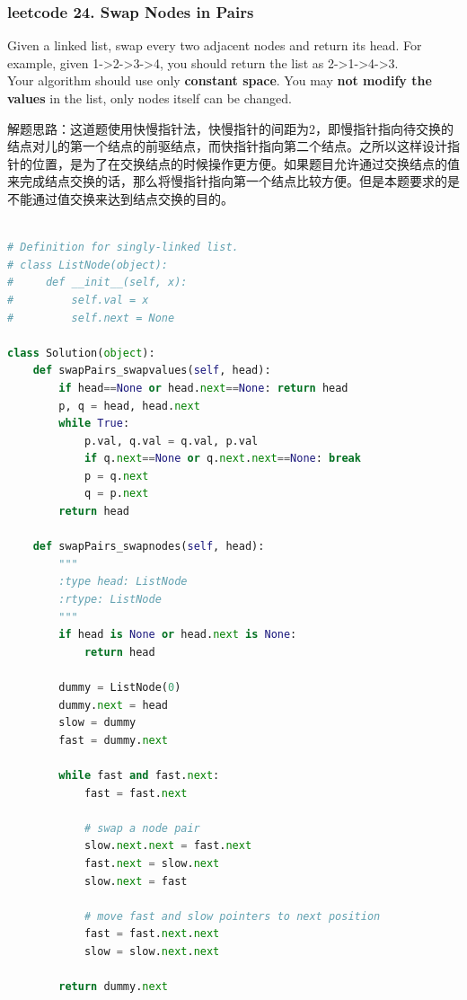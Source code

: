 \documentclass[a4paper,10pt]{article}
\begin{document}
\subsubsection{leetcode 24. Swap Nodes in Pairs}
Given a linked list, swap every two adjacent nodes and return its head. For example, given 1->2->3->4, you should return the list as 2->1->4->3. \\

\noindent Your algorithm should use only \textbf{constant space}. You may \textbf{not modify the values} in the list, only nodes itself can be changed. \\

\begin{CJK*}{UTF8}{gbsn}
\noindent 解题思路：这道题使用快慢指针法，快慢指针的间距为2，即慢指针指向待交换的结点对儿的第一个结点的前驱结点，而快指针指向第二个结点。之所以这样设计指针的位置，是为了在交换结点的时候操作更方便。如果题目允许通过交换结点的值来完成结点交换的话，那么将慢指针指向第一个结点比较方便。但是本题要求的是不能通过值交换来达到结点交换的目的。\\
\end{CJK*}

\begin{lstlisting}[language=Python, caption=Problem24. Swap Nodes in Pairs]

# Definition for singly-linked list.
# class ListNode(object):
#     def __init__(self, x):
#         self.val = x
#         self.next = None

class Solution(object):
    def swapPairs_swapvalues(self, head):
        if head==None or head.next==None: return head
        p, q = head, head.next
        while True:
            p.val, q.val = q.val, p.val
            if q.next==None or q.next.next==None: break
            p = q.next
            q = p.next
        return head
    
    def swapPairs_swapnodes(self, head):
        """
        :type head: ListNode
        :rtype: ListNode
        """
        if head is None or head.next is None:
            return head

        dummy = ListNode(0)
        dummy.next = head
        slow = dummy
        fast = dummy.next

        while fast and fast.next:
            fast = fast.next

            # swap a node pair
            slow.next.next = fast.next
            fast.next = slow.next
            slow.next = fast

            # move fast and slow pointers to next position
            fast = fast.next.next
            slow = slow.next.next

        return dummy.next
\end{lstlisting}
\end{document}
